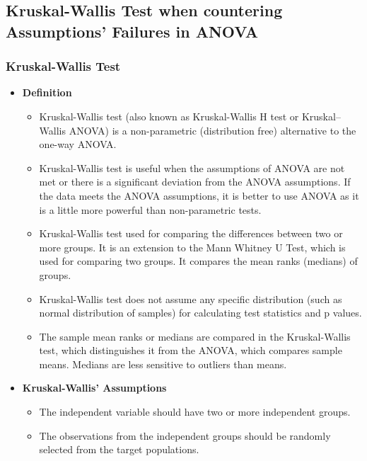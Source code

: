 \documentclass[a4paper]{article}
\begin{document}
\subsection{Kruskal-Wallis Test when countering Assumptions' Failures in ANOVA}
\subsubsection{Kruskal-Wallis Test}
\begin{itemize}
    \item[] \textbf{Definition}
    \begin{itemize}
        \item[] Kruskal-Wallis test (also known as Kruskal-Wallis H test or Kruskal–Wallis ANOVA) is a non-parametric (distribution free) alternative to the one-way ANOVA.
    
        \item[] Kruskal-Wallis test is useful when the assumptions of ANOVA are not met or there is a significant deviation from the ANOVA assumptions. If the data meets the ANOVA assumptions, it is better to use ANOVA as it is a little more powerful than non-parametric tests.
        
        \item[] Kruskal-Wallis test used for comparing the differences between two or more groups. It is an extension to the Mann Whitney U Test, which is used for comparing two groups. It compares the mean ranks (medians) of groups.
        
        \item[] Kruskal-Wallis test does not assume any specific distribution (such as normal distribution of samples) for calculating test statistics and p values.
        
        \item[] The sample mean ranks or medians are compared in the Kruskal-Wallis test, which distinguishes it from the ANOVA, which compares sample means. Medians are less sensitive to outliers than means.
    \end{itemize}
    
    \item[] \textbf{Kruskal-Wallis' Assumptions}
    \begin{itemize}
        \item[] The independent variable should have two or more independent groups.
        
        \item[] The observations from the independent groups should be randomly selected from the target populations.
        

\end{itemize}
\end{itemize}
\end{document}
